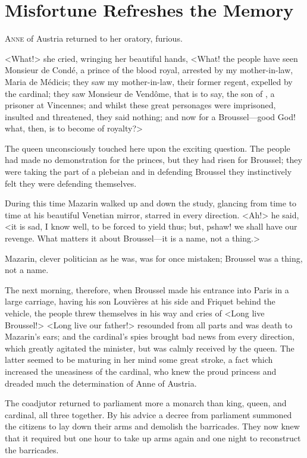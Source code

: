 \chapter{Misfortune Refreshes the Memory}

 \lettrine{A}{nne} of Austria returned to her oratory, furious.

\zz
<What!> she cried, wringing her beautiful hands, <What! the people have seen Monsieur de Condé, a prince of the blood royal, arrested by my mother-in-law, Maria de Médicis; they saw my mother-in-law, their former regent, expelled by the cardinal; they saw Monsieur de Vendôme, that is to say, the son of , a prisoner at Vincennes; and whilst these great personages were imprisoned, insulted and threatened, they said nothing; and now for a Broussel—good God! what, then, is to become of royalty?>

The queen unconsciously touched here upon the exciting question. The people had made no demonstration for the princes, but they had risen for Broussel; they were taking the part of a plebeian and in defending Broussel they instinctively felt they were defending themselves.

During this time Mazarin walked up and down the study, glancing from time to time at his beautiful Venetian mirror, starred in every direction. <Ah!> he said, <it is sad, I know well, to be forced to yield thus; but, pshaw! we shall have our revenge. What matters it about Broussel—it is a name, not a thing.>

Mazarin, clever politician as he was, was for once mistaken; Broussel was a thing, not a name.

The next morning, therefore, when Broussel made his entrance into Paris in a large carriage, having his son Louvières at his side and Friquet behind the vehicle, the people threw themselves in his way and cries of <Long live Broussel!> <Long live our father!> resounded from all parts and was death to Mazarin's ears; and the cardinal's spies brought bad news from every direction, which greatly agitated the minister, but was calmly received by the queen. The latter seemed to be maturing in her mind some great stroke, a fact which increased the uneasiness of the cardinal, who knew the proud princess and dreaded much the determination of Anne of Austria.

The coadjutor returned to parliament more a monarch than king, queen, and cardinal, all three together. By his advice a decree from parliament summoned the citizens to lay down their arms and demolish the barricades. They now knew that it required but one hour to take up arms again and one night to reconstruct the barricades.

